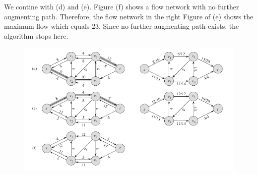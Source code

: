 We contine with (d) and (e). Figure (f) shows a flow network with no further augmenting path. Therefore, the flow network in the right Figure of (e) shows the maximum flow which equals $23$. Since no further augmenting path exists, the algorithm stops here.

\begin{figure}[H] \centering
\includegraphics[scale=0.5]{images/max_flow_ex_2.png}
\end{figure}



